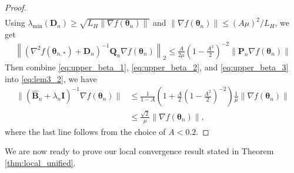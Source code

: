 \documentclass[11pt]{amsart}
\theoremstyle{plain}
\theoremstyle{definition}
\theoremstyle{remark}
\def\D{\mathbf{D}}
\def\bQ{\mathbf{Q}}
\def\bP{\mathbf{P}}
\def\B{\mathbf{B}}
\def\param{\boldsymbol{\theta}}
\begin{document}
\begin{proof}
\begin{align*}
\end{align*}
Using $\lambda_{\min}(\D_n)\geq \sqrt{L_H\|\nabla f(\param_n)\|}$ and $\|\nabla f(\param_n)\|\leq (A\mu)^2/L_H$, we get
\begin{align}\label{eq:upper_beta_3}
\left\|\left(\nabla^2f(\param_{n,*})+\D_n\right)^{-1}\bQ_{n}\nabla f(\param_n)\right\|_{2}\leq \frac{A}{2\mu}\left(1-\frac{A^2}{2}\right)^{-2}\|\bP_{n}\nabla f(\param_n)\|
\end{align}
Then combine \eqref{eq:upper_beta_1}, \eqref{eq:upper_beta_2}, and \eqref{eq:upper_beta_3} into \eqref{eq:lem3_2}, we have
\begin{align*}
    \|(\hat{\B}_n+\lambda_n\mathbf{I})^{-1}\nabla f(\param_n)\|&\leq \frac{1}{1-A}\left(1+\frac{A}{2}\left(1-\frac{A^2}{2}\right)^{-2}\right)\frac{1}{\mu}\|\nabla f(\param_n)\|\\
    &\leq \frac{\sqrt{2}}{\mu}\|\nabla f(\param_n)\|,
\end{align*}
where the last line follows from the choice of $A< 0.2.$
\end{proof}

We are now ready to prove our local convergence result stated in Theorem \ref{thm:local_unified}. 
\end{document}

